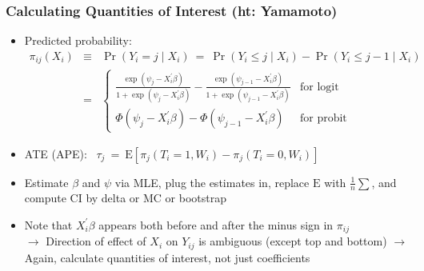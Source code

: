 \documentclass{beamer}
\begin{document}
\begin{frame}
\frametitle{Calculating Quantities of Interest  (ht: Yamamoto)}
{\small
\vspace{-.05in}
\begin{itemize}
    \item Predicted probability:
    \begin{eqnarray*}
    \pi_{ij}(X_i) & \equiv & \Pr(Y_i = j\mid X_i) \ = \
        \Pr(Y_i \leq j \mid X_i) - \Pr(Y_i \leq j-1 \mid X_i) \\
    & = & \left\{ \begin{array}{ll}
        \frac{\exp(\psi_j - X_i^{'}\beta)}{1 + \exp(\psi_j - X_i^{'}\beta)}
        - \frac{\exp(\psi_{j-1} - X_i^{'}\beta)}{1 + \exp(\psi_{j-1} - X_i^{'}\beta)}
        & \text{for logit} \\
        \Phi\left(\psi_j - X_i^{'}\beta\right) - \Phi\left(\psi_{j-1} - X_i^{'}\beta\right)
        & \text{for probit} \end{array} \right.
    \end{eqnarray*}
\pause
    \item ATE (APE): \ $\tau_j \  = \ \text{E}\left[\pi_{j}(T_i=1, W_i) - \pi_{j}(T_i=0, W_i)\right]$
\pause
\medskip
    \item Estimate $\beta$ and $\psi$ via MLE, plug the estimates in, replace $\text{E}$ with 
    $\frac{1}{n}\sum$, and compute CI by delta or MC or bootstrap
\medskip
\pause
    \item Note that $X_i^{'}\beta$ appears both before and after the minus sign in $\pi_{ij}$ \\
\pause
    $\longrightarrow$ Direction of effect of $X_i$ on $Y_{ij}$ is ambiguous (except top and bottom)
\pause
    $\longrightarrow$ Again, \alert{calculate quantities of interest, not just coefficients}
\end{itemize}
}
\end{frame}
\end{document}
